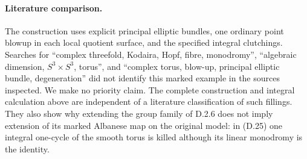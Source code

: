 \paragraph{Literature comparison.}
The construction uses explicit principal elliptic bundles,
one ordinary point blowup in each local quotient surface,
and the specified integral clutchings. Searches for
``complex threefold, Kodaira, Hopf, fibre, monodromy'',
``algebraic dimension, $S^3\times S^3$, torus'', and
``complex torus, blow-up, principal elliptic bundle,
degeneration'' did not identify this marked example in
the sources inspected. We make no priority claim.
The complete construction and integral calculation above
are independent of a literature classification of such
fillings. They also show why extending the group family
of D.2.6 does not imply extension of its marked Albanese
map on the original model: in (D.25) one integral
one-cycle of the smooth torus is killed although its
linear monodromy is the identity.



